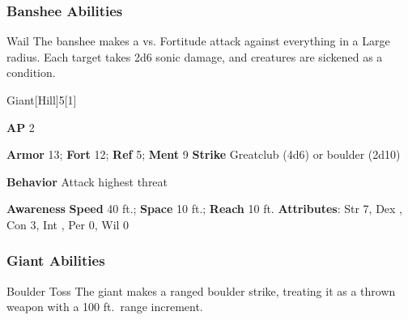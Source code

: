 \subsubsection{Banshee Abilities}

\begin{ability}{Wail}
The banshee makes a  vs. Fortitude attack against everything in a Large radius.
\hit Each target takes 2d6 sonic damage, and creatures are sickened as a condition.
\end{ability}

\begin{monsection}{Giant}[Hill]{5}[1]
\vspace{-1em}\vspace{-1em}
\begin{spellcontent}
\begin{spelltargetinginfo}
{\textbf{AP} 2}

\pari \textbf{Armor} 13;
\textbf{Fort} 12;
\textbf{Ref} 5;
\textbf{Ment} 9
\pari \textbf{Strike} Greatclub  (4d6) or boulder  (2d10)



\pari \textbf{Behavior} Attack highest threat
\end{spelltargetinginfo}
\end{spellcontent}

\begin{monsterfooter}
\pari \textbf{Awareness} 
\pari \textbf{Speed} 40 ft.;
\textbf{Space} 10 ft.;
\textbf{Reach} 10 ft.
\pari \textbf{Attributes}:
Str 7,
Dex ,
Con 3,
Int ,
Per 0,
Wil 0
\end{monsterfooter}
\end{monsection}


\subsubsection{Giant Abilities}

\begin{ability}{Boulder Toss}
The giant makes a ranged boulder strike, treating it as a thrown weapon with a 100 ft.\ range increment.
\end{ability}

